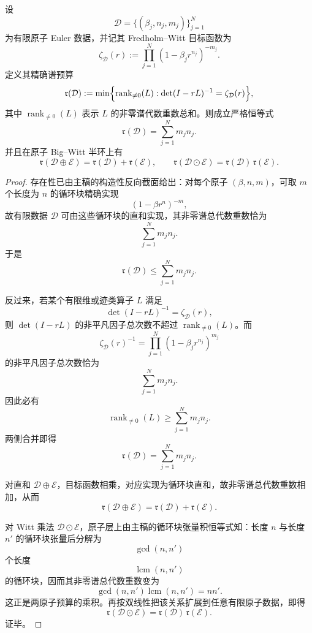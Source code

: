 \begin{theorem}\label{thm:conclusion-bigwitt-exact-spectral-budget}
设
\[
\mathcal D=\{(\beta_j,n_j,m_j)\}_{j=1}^{N}
\]
为有限原子 Euler 数据，并记其 Fredholm--Witt 目标函数为
\[
\zeta_{\mathcal D}(r):=
\prod_{j=1}^{N}(1-\beta_j r^{n_j})^{-m_j}.
\]
定义其精确谱预算
\[
\mathfrak r(\mathcal D):=
\min\Bigl\{
\operatorname{rank}_{\neq 0}(L):
\det(I-rL)^{-1}=\zeta_{\mathcal D}(r)
\Bigr\},
\]
其中 \(\operatorname{rank}_{\neq 0}(L)\) 表示 \(L\) 的非零谱代数重数总和。则成立严格恒等式
\[
\mathfrak r(\mathcal D)=\sum_{j=1}^{N}m_jn_j.
\]
并且在原子 Big--Witt 半环上有
\[
\mathfrak r(\mathcal D\oplus \mathcal E)=\mathfrak r(\mathcal D)+\mathfrak r(\mathcal E),
\qquad
\mathfrak r(\mathcal D\odot \mathcal E)=\mathfrak r(\mathcal D)\,\mathfrak r(\mathcal E).
\]
\end{theorem}
\begin{proof}
存在性已由主稿的构造性反向截面给出：对每个原子 \((\beta,n,m)\)，可取 \(m\) 个长度为 \(n\) 的循环块精确实现
\[
(1-\beta r^n)^{-m},
\]
故有限数据 \(\mathcal D\) 可由这些循环块的直和实现，其非零谱总代数重数恰为
\[
\sum_{j=1}^{N}m_jn_j.
\]
于是
\[
\mathfrak r(\mathcal D)\le \sum_{j=1}^{N}m_jn_j.
\]

反过来，若某个有限维或迹类算子 \(L\) 满足
\[
\det(I-rL)^{-1}=\zeta_{\mathcal D}(r),
\]
则 \(\det(I-rL)\) 的非平凡因子总次数不超过 \(\operatorname{rank}_{\neq 0}(L)\)。而
\[
\zeta_{\mathcal D}(r)^{-1}
=
\prod_{j=1}^{N}(1-\beta_j r^{n_j})^{m_j}
\]
的非平凡因子总次数恰为
\[
\sum_{j=1}^{N}m_jn_j.
\]
因此必有
\[
\operatorname{rank}_{\neq 0}(L)\ge \sum_{j=1}^{N}m_jn_j.
\]
两侧合并即得
\[
\mathfrak r(\mathcal D)=\sum_{j=1}^{N}m_jn_j.
\]

对直和 \(\mathcal D\oplus\mathcal E\)，目标函数相乘，对应实现为循环块直和，故非零谱总代数重数相加，从而
\[
\mathfrak r(\mathcal D\oplus\mathcal E)=\mathfrak r(\mathcal D)+\mathfrak r(\mathcal E).
\]

对 Witt 乘法 \(\mathcal D\odot\mathcal E\)，原子层上由主稿的循环块张量积恒等式知：长度 \(n\) 与长度 \(n'\) 的循环块张量后分解为
\[
\gcd(n,n')
\]
个长度
\[
\operatorname{lcm}(n,n')
\]
的循环块，因而其非零谱总代数重数变为
\[
\gcd(n,n')\operatorname{lcm}(n,n')=nn'.
\]
这正是两原子预算的乘积。再按双线性把该关系扩展到任意有限原子数据，即得
\[
\mathfrak r(\mathcal D\odot\mathcal E)=\mathfrak r(\mathcal D)\,\mathfrak r(\mathcal E).
\]
证毕。
\end{proof}

